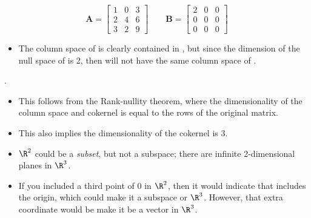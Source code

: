 \begin{itemize}
\begin{itemize}
      \[%
      \bm{A} =
      \begin{bmatrix}
        1 & 0 & 3 \\
        2 & 4 & 6 \\
        3 & 2 & 9
      \end{bmatrix} \qquad
      \bm{B} =
      \begin{bmatrix}
        2 & 0 & 0 \\
        0 & 0 & 0 \\
        0 & 0 & 0
      \end{bmatrix}
      \]%
      \begin{itemize}
        \item The column space of  is clearly contained in , but
          since the dimension of the null space of  is 2, then 
          will not have the same column space of .
      \end{itemize}


      .
      \begin{itemize}
        \item This follows from the Rank-nullity theorem, where the
          dimensionality of the column space and cokernel is equal to the rows
          of the original matrix.
        \item This also implies the dimensionality of the cokernel is 3.
      \end{itemize}


      \begin{itemize}
        \item \(\R^2\) could be a \textit{subset}, but not a subspace; there
          are infinite 2-dimensional planes in \(\R^3\).

        \item If you included a third point of 0 in \(\R^2\), then it would
          indicate that includes the origin, which could make it a subspace or
          \(\R^3\). However, that extra coordinate would be make it be a vector
          in \(\R^3\).
      \end{itemize}

  \end{itemize}

\end{itemize}

